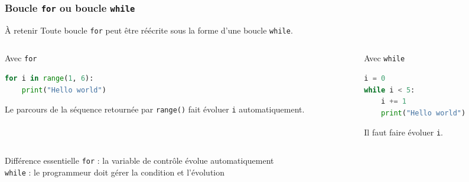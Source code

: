 \documentclass[10pt]{beamer}
\begin{document}
\begin{frame}[containsverbatim]
	\frametitle{Boucle \texttt{for} ou boucle \texttt{while}}
	
	\begin{alertblock}{À retenir}
		Toute boucle \texttt{for} peut être réécrite sous la forme
		d'une boucle \texttt{while}.
	\end{alertblock}
	
	\vspace{0.15cm}
	
	\begin{columns}[T]
		
		\begin{column}{0.48\textwidth}
			\begin{exampleblock}{Avec \texttt{for}}
\begin{lstlisting}[language=Python]
for i in range(1, 6):
	print("Hello world")
\end{lstlisting}
				
				\centering
				\small
				Le parcours de la séquence retournée par \texttt{range()} fait évoluer
				\texttt{i} automatiquement.
			\end{exampleblock}
		\end{column}
		
		\begin{column}{0.48\textwidth}
			\begin{exampleblock}{Avec \texttt{while}}
				\begin{lstlisting}[language=Python]
i = 0
while i < 5:
	i += 1
	print("Hello world")
				\end{lstlisting}
				
				\centering
				\small
				Il faut faire évoluer
				 \texttt{i}.
			\end{exampleblock}
		\end{column}
		
	\end{columns}
	
	\vspace{0.1cm}
	
	\begin{block}{Différence essentielle}
		\centering
		\texttt{for} : la variable de contrôle évolue automatiquement		\\
		\texttt{while} : le programmeur doit gérer la condition et l'évolution
	\end{block}
	
\end{frame}
\end{document}
